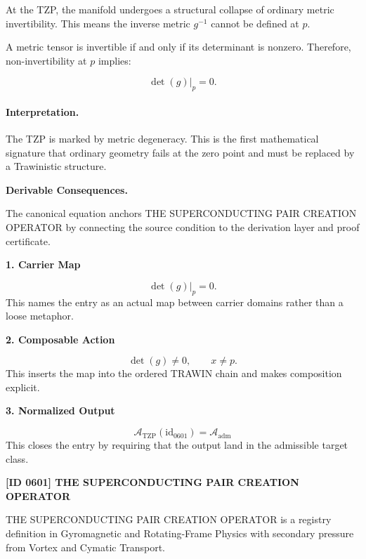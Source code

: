 At the TZP, the manifold undergoes a structural collapse of ordinary metric invertibility. This means the inverse metric $g^{-1}$ cannot be defined at $p$.

A metric tensor is invertible if and only if its determinant is nonzero. Therefore, non-invertibility at $p$ implies:

\begin{equation}
\det(g)\big|_{p}=0 .
\end{equation}

\paragraph{Interpretation.}
The TZP is marked by metric degeneracy. This is the first mathematical signature that ordinary geometry fails at the zero point and must be replaced by a Trawinistic structure.

\par\vspace{0.35em}
\noindent\textbf{Derivable Consequences.}\quad
\begingroup
\footnotesize
\raggedright
The canonical equation anchors THE SUPERCONDUCTING PAIR CREATION OPERATOR by connecting the source condition to the derivation layer and proof certificate.
\par\endgroup

\noindent\textbf{1. Carrier Map}\par
\[
\det(g)\big|_{p}=0.
\]
\noindent This names the entry as an actual map between carrier domains rather than a loose metaphor.\par
\noindent\textbf{2. Composable Action}\par
\[
\det(g)\neq 0, \qquad x\neq p.
\]
\noindent This inserts the map into the ordered TRAWIN chain and makes composition explicit.\par
\noindent\textbf{3. Normalized Output}\par
\[
\mathcal{A}_{\mathrm{TZP}}(\mathrm{id}_{0601})=\mathcal{A}_{\mathrm{adm}}
\]
\noindent This closes the entry by requiring that the output land in the admissible target class.\par

\clearpage
\noindent\textbf{[ID 0601] THE SUPERCONDUCTING PAIR CREATION OPERATOR}\par
\vspace{0.35em}
\begingroup\small
{}
THE SUPERCONDUCTING PAIR CREATION OPERATOR is a registry definition in Gyromagnetic and Rotating-Frame Physics with secondary pressure from Vortex and Cymatic Transport.

